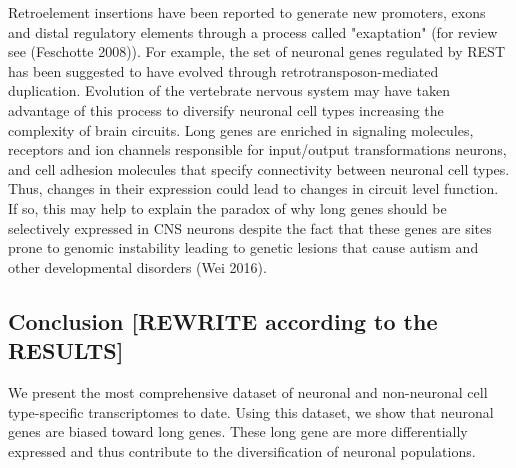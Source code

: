 Retroelement insertions have been reported to generate new promoters, exons and distal regulatory elements through a process called "exaptation" (for review see (Feschotte 2008)). For example, the set of neuronal genes regulated by REST has been suggested to have evolved through retrotransposon-mediated duplication\cite{Johnson_2006}.  Evolution of the vertebrate nervous system may have taken advantage of this process to diversify neuronal cell types increasing the complexity of brain circuits. Long genes are enriched in signaling molecules, receptors and ion channels responsible for input/output transformations neurons, and cell adhesion molecules that specify connectivity between neuronal cell types. Thus, changes in their expression could lead to changes in circuit level function. If so, this may help to explain the paradox of why long genes should be selectively expressed in CNS neurons despite the fact that these genes are sites prone to genomic instability leading to genetic lesions that cause autism and other developmental disorders (Wei 2016).

\subsection{Conclusion [REWRITE according to the RESULTS]}
We present the most comprehensive dataset of neuronal and non-neuronal cell type-specific transcriptomes to date. Using this dataset, we show that neuronal genes are biased toward long genes. These long gene are more differentially expressed and thus contribute to the diversification of neuronal populations.
